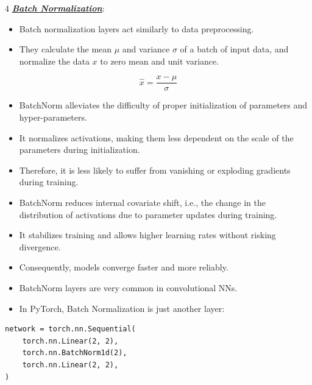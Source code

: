 \documentclass[12pt]{article}
\newcommand{\bulletPoint}[1]{\ul{\textit{\textbf{#1}}}}
\begin{document}
\begin{multicols*}{4}
\bulletPoint{Batch Normalization}:
\begin{itemize}
\item Batch normalization layers act similarly to data preprocessing.
\item They calculate the mean $\mu$ and variance $\sigma$ of a batch of input data, and normalize the data $x$ to zero mean and unit variance.
\end{itemize}
\useshortskip
\begin{equation*}
    \hat{x}=\frac{x-\mu}{\sigma}
\end{equation*}
\begin{itemize}
\item BatchNorm alleviates the difficulty of proper initialization of parameters and hyper-parameters.
\item It normalizes activations, making them less dependent on the scale of the parameters during initialization.
\item Therefore, it is less likely to suffer from vanishing or exploding gradients during training.
\item BatchNorm reduces internal covariate shift, i.e., the change in the distribution of activations due to parameter updates during training.
\item It stabilizes training and allows higher learning rates without risking divergence.
\item Consequently, models converge faster and more reliably.
\item BatchNorm layers are very common in convolutional NNs.
\item In PyTorch, Batch Normalization is just another layer:
\end{itemize}
\begin{lstlisting}
network = torch.nn.Sequential(
    torch.nn.Linear(2, 2),
    torch.nn.BatchNorm1d(2),
    torch.nn.Linear(2, 2),
)
\end{lstlisting}


\end{multicols*}
\end{document}
